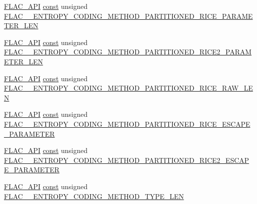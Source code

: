 \begin{DoxyCompactItemize}
\item 
\hyperlink{group__flac__export_ga56ca07df8a23310707732b1c0007d6f5}{F\+L\+A\+C\+\_\+\+A\+PI} \hyperlink{zconf_8h_a2c212835823e3c54a8ab6d95c652660e}{const} unsigned \hyperlink{group__flac__format_ga1b66dd050e207a941555dd1a5dd184d3}{F\+L\+A\+C\+\_\+\+\_\+\+E\+N\+T\+R\+O\+P\+Y\+\_\+\+C\+O\+D\+I\+N\+G\+\_\+\+M\+E\+T\+H\+O\+D\+\_\+\+P\+A\+R\+T\+I\+T\+I\+O\+N\+E\+D\+\_\+\+R\+I\+C\+E\+\_\+\+P\+A\+R\+A\+M\+E\+T\+E\+R\+\_\+\+L\+EN}
\item 
\hyperlink{group__flac__export_ga56ca07df8a23310707732b1c0007d6f5}{F\+L\+A\+C\+\_\+\+A\+PI} \hyperlink{zconf_8h_a2c212835823e3c54a8ab6d95c652660e}{const} unsigned \hyperlink{group__flac__format_ga9266ba16c700a7c7600d7ed57a1b0d8e}{F\+L\+A\+C\+\_\+\+\_\+\+E\+N\+T\+R\+O\+P\+Y\+\_\+\+C\+O\+D\+I\+N\+G\+\_\+\+M\+E\+T\+H\+O\+D\+\_\+\+P\+A\+R\+T\+I\+T\+I\+O\+N\+E\+D\+\_\+\+R\+I\+C\+E2\+\_\+\+P\+A\+R\+A\+M\+E\+T\+E\+R\+\_\+\+L\+EN}
\item 
\hyperlink{group__flac__export_ga56ca07df8a23310707732b1c0007d6f5}{F\+L\+A\+C\+\_\+\+A\+PI} \hyperlink{zconf_8h_a2c212835823e3c54a8ab6d95c652660e}{const} unsigned \hyperlink{group__flac__format_gac4552a7a6b9c771ee47ee51fa998ca5f}{F\+L\+A\+C\+\_\+\+\_\+\+E\+N\+T\+R\+O\+P\+Y\+\_\+\+C\+O\+D\+I\+N\+G\+\_\+\+M\+E\+T\+H\+O\+D\+\_\+\+P\+A\+R\+T\+I\+T\+I\+O\+N\+E\+D\+\_\+\+R\+I\+C\+E\+\_\+\+R\+A\+W\+\_\+\+L\+EN}
\item 
\hyperlink{group__flac__export_ga56ca07df8a23310707732b1c0007d6f5}{F\+L\+A\+C\+\_\+\+A\+PI} \hyperlink{zconf_8h_a2c212835823e3c54a8ab6d95c652660e}{const} unsigned \hyperlink{group__flac__format_ga176b89e2ee2e08d0790bfbab2fa213a0}{F\+L\+A\+C\+\_\+\+\_\+\+E\+N\+T\+R\+O\+P\+Y\+\_\+\+C\+O\+D\+I\+N\+G\+\_\+\+M\+E\+T\+H\+O\+D\+\_\+\+P\+A\+R\+T\+I\+T\+I\+O\+N\+E\+D\+\_\+\+R\+I\+C\+E\+\_\+\+E\+S\+C\+A\+P\+E\+\_\+\+P\+A\+R\+A\+M\+E\+T\+ER}
\item 
\hyperlink{group__flac__export_ga56ca07df8a23310707732b1c0007d6f5}{F\+L\+A\+C\+\_\+\+A\+PI} \hyperlink{zconf_8h_a2c212835823e3c54a8ab6d95c652660e}{const} unsigned \hyperlink{group__flac__format_ga08bc0c9e0fd088cbea13bc3b11c4d4d4}{F\+L\+A\+C\+\_\+\+\_\+\+E\+N\+T\+R\+O\+P\+Y\+\_\+\+C\+O\+D\+I\+N\+G\+\_\+\+M\+E\+T\+H\+O\+D\+\_\+\+P\+A\+R\+T\+I\+T\+I\+O\+N\+E\+D\+\_\+\+R\+I\+C\+E2\+\_\+\+E\+S\+C\+A\+P\+E\+\_\+\+P\+A\+R\+A\+M\+E\+T\+ER}
\item 
\hyperlink{group__flac__export_ga56ca07df8a23310707732b1c0007d6f5}{F\+L\+A\+C\+\_\+\+A\+PI} \hyperlink{zconf_8h_a2c212835823e3c54a8ab6d95c652660e}{const} unsigned \hyperlink{group__flac__format_ga1d49716deb8775a027f78b059b61c2e0}{F\+L\+A\+C\+\_\+\+\_\+\+E\+N\+T\+R\+O\+P\+Y\+\_\+\+C\+O\+D\+I\+N\+G\+\_\+\+M\+E\+T\+H\+O\+D\+\_\+\+T\+Y\+P\+E\+\_\+\+L\+EN}

\end{DoxyCompactItemize}

